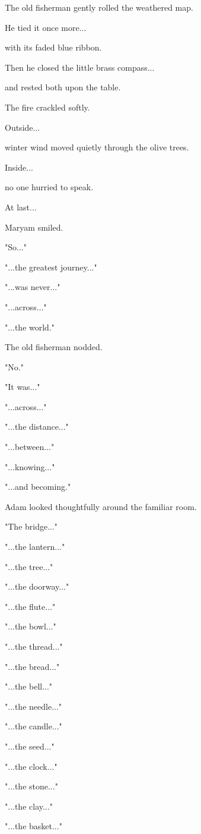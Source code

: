 \documentclass[12pt,openany]{book}
\begin{document}
The old fisherman gently rolled the weathered map.

He tied it once more...

with its faded blue ribbon.

Then he closed the little brass compass...

and rested both upon the table.

The fire crackled softly.

Outside...

winter wind moved quietly through the olive trees.

Inside...

no one hurried to speak.

At last...

Maryam smiled.

"So..."

"...the greatest journey..."

"...was never..."

"...across..."

"...the world."

The old fisherman nodded.

"No."

"It was..."

"...across..."

"...the distance..."

"...between..."

"...knowing..."

"...and becoming."

Adam looked thoughtfully around the familiar room.

"The bridge..."

"...the lantern..."

"...the tree..."

"...the doorway..."

"...the flute..."

"...the bowl..."

"...the thread..."

"...the bread..."

"...the bell..."

"...the needle..."

"...the candle..."

"...the seed..."

"...the clock..."

"...the stone..."

"...the clay..."

"...the basket..."
\end{document}
